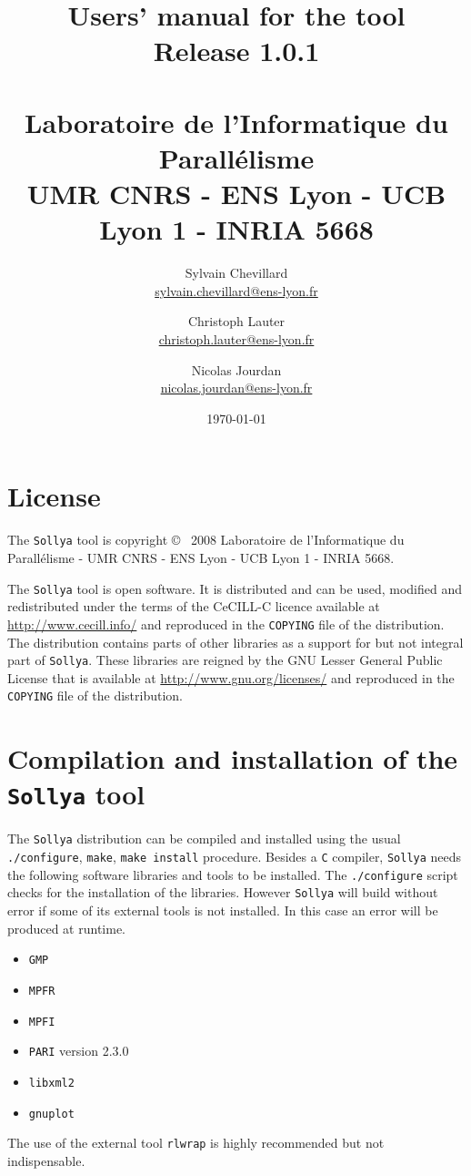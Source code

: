 \documentclass[a4paper]{article}
\title{Users' manual for the \sollya tool \\ {\large Release 1.0.1} \\ ~ \\ {\large Laboratoire de l'Informatique du Parall\'elisme \\ UMR CNRS - ENS Lyon - UCB Lyon 1 - INRIA 5668}}
\author{Sylvain Chevillard \\ \small{\url{sylvain.chevillard@ens-lyon.fr}} \and Christoph Lauter \\ \small{\url{christoph.lauter@ens-lyon.fr}} \and Nicolas Jourdan \\ \small{\url{nicolas.jourdan@ens-lyon.fr}}}
\date{\today}
\newcommand{\sollya}{\texttt{Sollya}\xspace}
\begin{document}
\maketitle

\section*{License}

The \sollya tool is copyright \copyright~ 2008 Laboratoire de
l'Informatique du Parall\'elisme - UMR CNRS - ENS Lyon - UCB Lyon 1 -
INRIA 5668.  

The \sollya tool is open software. It is distributed and can be used,
modified and redistributed under the terms of the CeCILL-C licence
available at \url{http://www.cecill.info/} and reproduced in the
\texttt{COPYING} file of the distribution. The distribution contains
parts of other libraries as a support for but not integral part of
\sollya. These libraries are reigned by the GNU Lesser General Public
License that is available at \url{http://www.gnu.org/licenses/} and
reproduced in the \texttt{COPYING} file of the distribution.

\tableofcontents

\section{Compilation and installation of the \sollya tool}

The \sollya distribution can be compiled and installed using the usual
\texttt{./configure}, \texttt{make}, \texttt{make install}
procedure. Besides a \texttt{C} compiler, \sollya needs the following
software libraries and tools to be installed. The \texttt{./configure}
script checks for the installation of the libraries. However \sollya
will build without error if some of its external tools is not
installed. In this case an error will be produced at runtime.
\begin{itemize}
\item \texttt{GMP}
\item \texttt{MPFR}
\item \texttt{MPFI}
\item \texttt{PARI} version 2.3.0
\item \texttt{libxml2}
\item \texttt{gnuplot}
\end{itemize}
The use of the external tool \texttt{rlwrap} is highly recommended but
not indispensable.
\end{document}
